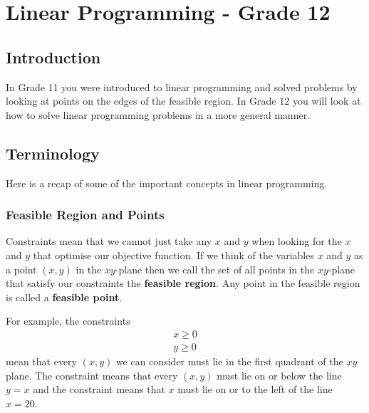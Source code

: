 \chapter{Linear Programming - Grade 12}
\label{m:lp12}



\section{Introduction}
In Grade 11 you were introduced to linear programming and solved problems by looking at points on the edges of the feasible region. In Grade 12 you will look at how to solve linear programming problems in a more general manner.

\section{Terminology}
Here is a recap of some of the important concepts in linear programming.

\subsection{Feasible Region and Points}
Constraints mean that we cannot just take any $x$ and $y$ when looking for the $x$ and $y$ that optimise our objective function. If we think of the variables $x$ and $y$ as a point $(x,y)$ in the $xy$-plane then we call the set of all points in the $xy$-plane that satisfy our constraints the \textbf{feasible region}. Any point in the feasible region is called a \textbf{feasible point}.

For example, the constraints
\begin{eqnarray*}
x\geq 0\\
y\geq 0
\end{eqnarray*}
mean that every $(x,y)$ we can consider must lie in the first quadrant of the $xy$ plane. The constraint
means that every $(x,y)$ must lie on or below the line $y=x$ and the constraint
means that $x$ must lie on or to the left of the line $x=20$. 

